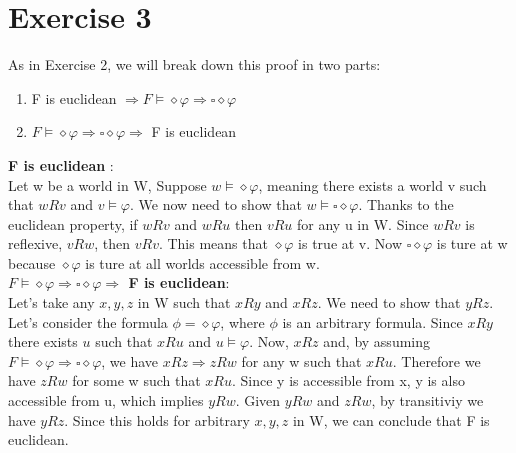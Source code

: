 \documentclass[11pt]{exam}
\begin{document}
\section*{Exercise 3}
As in Exercise 2, we will break down this proof in two parts:
\begin{enumerate}
    \item F is euclidean \(\Rightarrow F \vDash \diamond \varphi \Rightarrow \square \diamond \varphi\)
    \item \(F \vDash \diamond \varphi \Rightarrow \square \diamond \varphi \Rightarrow\) F is euclidean
\end{enumerate}
\textbf{F is euclidean} : \\
Let w be a world in W, Suppose \(w \vDash \diamond \varphi\), meaning there exists a world v such that \(wRv\) and \(v \vDash \varphi\).
We now need to show that \(w \vDash \square \diamond \varphi\). Thanks to the euclidean property, if \(wRv\) and \(wRu\) then \(vRu\) for any u in W.
Since \(wRv\) is reflexive, \(vRw\), then \(vRv\). This means that \(\diamond \varphi\) is true at v. Now \(\square \diamond \varphi\) is ture at w because \(\diamond \varphi\) is ture at all worlds accessible from w. \\
\textbf{\(F \vDash \diamond \varphi \Rightarrow \square \diamond \varphi \Rightarrow\) F is euclidean}: \\
Let's take any \(x, y, z\) in W such that \(xRy\) and \(xRz\). We need to show that \(yRz\).
Let's consider the formula \(\phi = \diamond \varphi\), where \(\phi\) is an arbitrary formula. Since \(xRy\) there exists \(u\) such that \(xRu\) and \(u \vDash \varphi\).
Now, \(xRz\) and, by assuming \(F \vDash \diamond \varphi \Rightarrow \square \diamond \varphi\), we have \(xRz \Rightarrow zRw\) for any w such that \(xRu\).
Therefore we have \(zRw\) for some w such that \(xRu\). Since y is accessible from x, y is also accessible from u, which implies \(yRw\).
Given \(yRw\) and \(zRw\), by transitiviy we have \(yRz\).
Since this holds for arbitrary \(x, y, z\) in W, we can conclude that F is euclidean.
\end{document}
